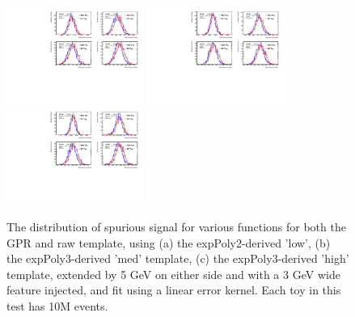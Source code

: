 \begin{figure} 
\begin{center}
  \includegraphics[width=0.4\textwidth]{figures/background/gpr/validation/linear/ToyTest_FitSigVals_lowpT_10M_Sig}   
  \includegraphics[width=0.4\textwidth]{figures/background/gpr/validation/linear/ToyTest_FitSigVals_medpT_10M_Sig}   
  \includegraphics[width=0.4\textwidth]{figures/background/gpr/validation/linear/ToyTest_FitSigVals_highpT_10M_Sig}   
\caption{The distribution of spurious signal for various functions for both the GPR and raw template, using (a) the expPoly2-derived 'low', (b) the expPoly3-derived 'med' template, (c) the expPoly3-derived 'high' template, extended by 5 GeV on either side and with a 3 GeV wide feature injected, and fit using a linear error kernel. Each toy in this test has 10M events.}
\label{fig:linearkernel_lowpt_10M_Sig}
\end{center}
\end{figure}

